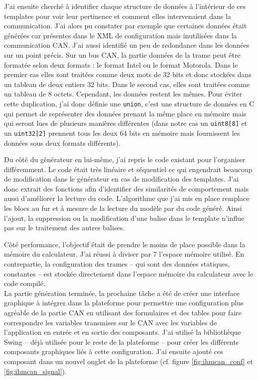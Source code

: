 J'ai ensuite cherché à identifier chaque structure de données à l'intérieur de
ces templates pour voir leur pertinence et comment elles intervenaient dans la
communication. J'ai alors pu constater par exemple que certaines données était
générées car présentes dans le XML de configuration mais inutilisées dans la
communication CAN. J'ai aussi identifié un peu de redondance dans les données
sur un point précis. Sur un bus CAN, la partie données de la trame peut être
formatée selon deux formats : le format Intel ou le format Motorola. Dans le
premier cas elles sont traitées comme deux mots de 32 bits et donc stockées dans
un tableau de deux entiers 32 bits. Dans le second cas, elles sont
traitées comme un tableau de 8 octets. Cependant, les données restent les mêmes.
Pour éviter cette duplication, j'ai donc définie une {\tt union}, c'est une
structure de données en C qui permet de représenter des données prenant la même
place en mémoire mais qui seront lues de plusieurs manières différentes (dans
notre cas un {\tt uint8[8]} et un {\tt uint32[2]} prennent tous les deux 64 bits
en mémoire mais fournissent les données sous deux formats différents).

Du côté du générateur en lui-même, j'ai repris le code existant pour l'organiser
différemment. Le code était très linéaire et séquentiel ce qui engendrait
beaucoup de modification dans le générateur en cas de modification des
templates. J'ai donc extrait des fonctions afin d'identifier des similarités de
comportement mais aussi d'améliorer la lecture du code. L'algorithme que j'ai
mis en place remplace les blocs au fur et à mesure de la lecture du modèle par
du code généré. Ainsi l'ajout, la suppression ou la modification d'une balise
dans le template n'influe pas sur le traitement des autres balises.

Côté performance, l'objectif était de prendre le moins de place possible dans la
mémoire du calculateur. J'ai réussi à diviser par 7 l'espace mémoire utilisé. En
contrepartie, la configuration des trames -- qui sont des données statiques,
constantes -- est stockée directement dans l'espace mémoire du calculateur avec
le code compilé.\\

La partie génération terminée, la prochaine tâche a été de créer une interface
graphique à intégrer dans la plateforme pour permettre une configuration plus
agréable de la partie CAN en utilisant des formulaires et des tables pour faire
correspondre les variables transmises sur le CAN avec les variables de
l'application en entrée et en sortie des composants. J'ai utilisé la
bibliothèque Swing -- déjà utilisée pour le reste de la plateforme -- pour
créer les différents composants graphiques liés à cette configuration. J'ai
ensuite ajouté ces composant dans un nouvel onglet de la plateforme (cf. figure
\ref{fig:ihmcan_conf} et \ref{fig:ihmcan_signal}).



